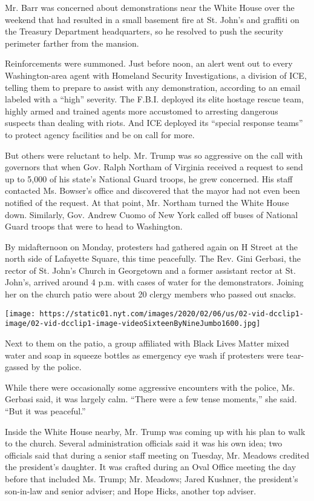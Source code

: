 Mr. Barr was concerned about demonstrations near the White House over
the weekend that had resulted in a small basement fire at St. John's and
graffiti on the Treasury Department headquarters, so he resolved to push
the security perimeter farther from the mansion.

Reinforcements were summoned. Just before noon, an alert went out to
every Washington-area agent with Homeland Security Investigations, a
division of ICE, telling them to prepare to assist with any
demonstration, according to an email labeled with a ``high'' severity.
The F.B.I. deployed its elite hostage rescue team, highly armed and
trained agents more accustomed to arresting dangerous suspects than
dealing with riots. And ICE deployed its ``special response teams'' to
protect agency facilities and be on call for more.

But others were reluctant to help. Mr. Trump was so aggressive on the
call with governors that when Gov. Ralph Northam of Virginia received a
request to send up to 5,000 of his state's National Guard troops, he
grew concerned. His staff contacted Ms. Bowser's office and discovered
that the mayor had not even been notified of the request. At that point,
Mr. Northam turned the White House down. Similarly, Gov. Andrew Cuomo of
New York called off buses of National Guard troops that were to head to
Washington.

By midafternoon on Monday, protesters had gathered again on H Street at
the north side of Lafayette Square, this time peacefully. The Rev. Gini
Gerbasi, the rector of St. John's Church in Georgetown and a former
assistant rector at St. John's, arrived around 4 p.m. with cases of
water for the demonstrators. Joining her on the church patio were about
20 clergy members who passed out snacks.

\texttt{[image: https://static01.nyt.com/images/2020/02/06/us/02-vid-dcclip1-image/02-vid-dcclip1-image-videoSixteenByNineJumbo1600.jpg]}

Next to them on the patio, a group affiliated with Black Lives Matter
mixed water and soap in squeeze bottles as emergency eye wash if
protesters were tear-gassed by the police.

While there were occasionally some aggressive encounters with the
police, Ms. Gerbasi said, it was largely calm. ``There were a few tense
moments,'' she said. ``But it was peaceful.''

Inside the White House nearby, Mr. Trump was coming up with his plan to
walk to the church. Several administration officials said it was his own
idea; two officials said that during a senior staff meeting on Tuesday,
Mr. Meadows credited the president's daughter. It was crafted during an
Oval Office meeting the day before that included Ms. Trump; Mr. Meadows;
Jared Kushner, the president's son-in-law and senior adviser; and Hope
Hicks, another top adviser.

